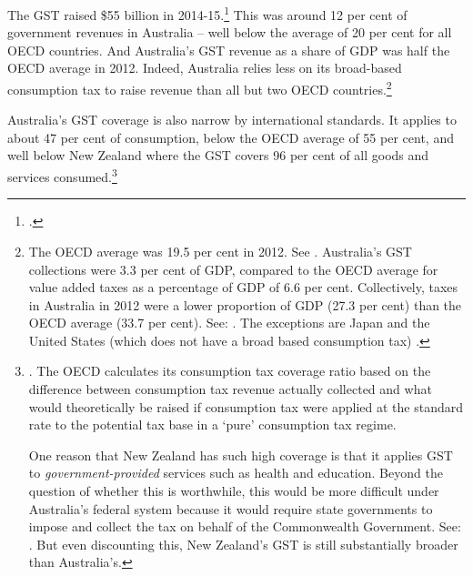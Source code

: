 \documentclass{grattanAlpha}
\begin{document}
The GST raised \$55 billion in 2014-15.\footcite[][5]{Treasury2015FinalBudgetOutcome1415}  This was around 12 per cent of government revenues in Australia – well below the average of 20 per cent for all OECD countries.  And Australia’s GST revenue as a share of GDP was half the OECD average in 2012. Indeed, Australia relies less on its broad-based consumption tax to raise revenue than all but two OECD countries.\footnote{The OECD average was 19.5 per cent in 2012. See \textcite{OECD2014}. Australia’s GST collections were 3.3 per cent of GDP, compared to the OECD average for value added taxes as a percentage of GDP of 6.6 per cent. Collectively, taxes in Australia in 2012 were a lower proportion of GDP (27.3 per cent) than the OECD average (33.7 per cent). See: \textcite{OECD2015b}.
The exceptions are Japan and the United States (which does not have a broad based consumption tax) \textcite[][40]{OECD2014}.}

Australia’s GST coverage is also narrow by international standards. It applies to about 47 per cent of consumption, below the OECD average of 55 per cent,   and well below New Zealand where the GST covers 96 per cent of all goods and services consumed.\footnote{\textcite[][95]{OECD2014}. The OECD calculates its consumption tax coverage ratio based on the difference between consumption tax revenue actually collected and what would theoretically be raised if consumption tax were applied at the standard rate to the potential tax base in a ‘pure’ consumption tax regime.

One reason that New Zealand has such high coverage is that it applies GST to \emph{government-provided} services such as health and education. Beyond the question of whether this is worthwhile, this would be more difficult under Australia’s federal system because it would require state governments to impose and collect the tax on behalf of the Commonwealth Government. See: \textcite{Millar2015}. But even discounting this, New Zealand’s GST is still substantially broader than Australia’s.}  
\end{document}
